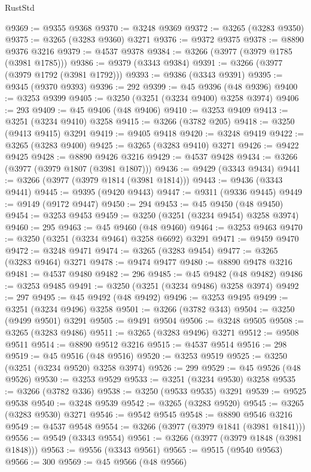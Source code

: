 \begin{lexlean}{RustStd}
\begin{coremodule}
@9369 := @9355 @9368
@9370 := @3248 @9369
@9372 := @3265 (@3283 @9350)
@9375 := @3265 (@3283 @9360) @3271
@9376 := @9372 @9375
@9378 := @8890 @9376 @3216
@9379 := @4537 @9378
@9384 := @3266 (@3977 (@3979 @1785 (@3981 @1785)))
@9386 := @9379 (@3343 @9384)
@9391 := @3266 (@3977 (@3979 @1792 (@3981 @1792)))
@9393 := @9386 (@3343 @9391)
@9395 := @9345 (@9370 @9393)
@9396 := 292
@9399 := @45 @9396 (@48 @9396)
@9400 := @3253 @9399
@9405 := @3250 (@3251 (@3234 @9400) @3258 @3974)
@9406 := 293
@9409 := @45 @9406 (@48 @9406)
@9410 := @3253 @9409
@9413 := @3251 (@3234 @9410) @3258
@9415 := @3266 (@3782 @205)
@9418 := @3250 (@9413 @9415) @3291
@9419 := @9405 @9418
@9420 := @3248 @9419
@9422 := @3265 (@3283 @9400)
@9425 := @3265 (@3283 @9410) @3271
@9426 := @9422 @9425
@9428 := @8890 @9426 @3216
@9429 := @4537 @9428
@9434 := @3266 (@3977 (@3979 @1807 (@3981 @1807)))
@9436 := @9429 (@3343 @9434)
@9441 := @3266 (@3977 (@3979 @1814 (@3981 @1814)))
@9443 := @9436 (@3343 @9441)
@9445 := @9395 (@9420 @9443)
@9447 := @9311 (@9336 @9445)
@9449 := @9149 (@9172 @9447)
@9450 := 294
@9453 := @45 @9450 (@48 @9450)
@9454 := @3253 @9453
@9459 := @3250 (@3251 (@3234 @9454) @3258 @3974)
@9460 := 295
@9463 := @45 @9460 (@48 @9460)
@9464 := @3253 @9463
@9470 := @3250 (@3251 (@3234 @9464) @3258 @6692) @3291
@9471 := @9459 @9470
@9472 := @3248 @9471
@9474 := @3265 (@3283 @9454)
@9477 := @3265 (@3283 @9464) @3271
@9478 := @9474 @9477
@9480 := @8890 @9478 @3216
@9481 := @4537 @9480
@9482 := 296
@9485 := @45 @9482 (@48 @9482)
@9486 := @3253 @9485
@9491 := @3250 (@3251 (@3234 @9486) @3258 @3974)
@9492 := 297
@9495 := @45 @9492 (@48 @9492)
@9496 := @3253 @9495
@9499 := @3251 (@3234 @9496) @3258
@9501 := @3266 (@3782 @343)
@9504 := @3250 (@9499 @9501) @3291
@9505 := @9491 @9504
@9506 := @3248 @9505
@9508 := @3265 (@3283 @9486)
@9511 := @3265 (@3283 @9496) @3271
@9512 := @9508 @9511
@9514 := @8890 @9512 @3216
@9515 := @4537 @9514
@9516 := 298
@9519 := @45 @9516 (@48 @9516)
@9520 := @3253 @9519
@9525 := @3250 (@3251 (@3234 @9520) @3258 @3974)
@9526 := 299
@9529 := @45 @9526 (@48 @9526)
@9530 := @3253 @9529
@9533 := @3251 (@3234 @9530) @3258
@9535 := @3266 (@3782 @336)
@9538 := @3250 (@9533 @9535) @3291
@9539 := @9525 @9538
@9540 := @3248 @9539
@9542 := @3265 (@3283 @9520)
@9545 := @3265 (@3283 @9530) @3271
@9546 := @9542 @9545
@9548 := @8890 @9546 @3216
@9549 := @4537 @9548
@9554 := @3266 (@3977 (@3979 @1841 (@3981 @1841)))
@9556 := @9549 (@3343 @9554)
@9561 := @3266 (@3977 (@3979 @1848 (@3981 @1848)))
@9563 := @9556 (@3343 @9561)
@9565 := @9515 (@9540 @9563)
@9566 := 300
@9569 := @45 @9566 (@48 @9566)

\end{coremodule}
\end{lexlean}
